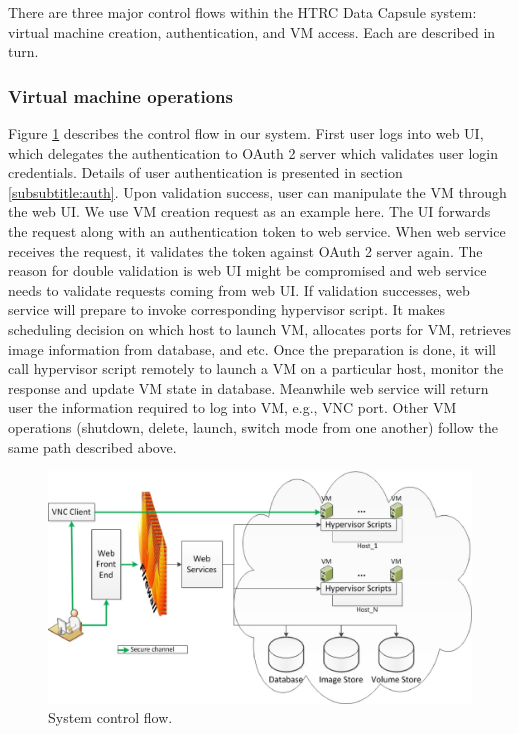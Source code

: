 \documentclass{acm_proc_article-sp}
\begin{document}
There are three major control flows within the HTRC Data Capsule system:   virtual machine creation, authentication, and VM access.  Each are described in turn.

\subsubsection{Virtual machine operations} \label{subsubtitle:control}
Figure \ref{fig:control} describes the control flow in our system. First user logs into web UI, which delegates the authentication to OAuth 2 server which validates user login credentials. Details of user authentication is presented in section \ref{subsubtitle:auth}. Upon validation success, user can manipulate the VM through the web UI. We use VM creation request as an example here. The UI forwards the request along with an authentication token to web service. When web service receives the request, it validates the token against OAuth 2 server again. The reason for double validation is web UI might be compromised and web service needs to validate requests coming from web UI. If validation successes, web service will prepare to invoke corresponding hypervisor script. It makes scheduling decision on which host to launch VM, allocates ports for VM, retrieves image information from database, and etc. Once the preparation is done, it will call hypervisor script remotely to launch a VM on a particular host, monitor the response and update VM state in database. Meanwhile web service will return user the information required to log into VM, e.g., VNC port. Other VM operations (shutdown, delete, launch, switch mode from one another) follow the same path described above.

\begin{figure}[ht]
  \centering
  \includegraphics[scale=0.35]{figures/workflow-control}
  \caption{System control flow.}
  \label{fig:control}
\end{figure}
\end{document}
